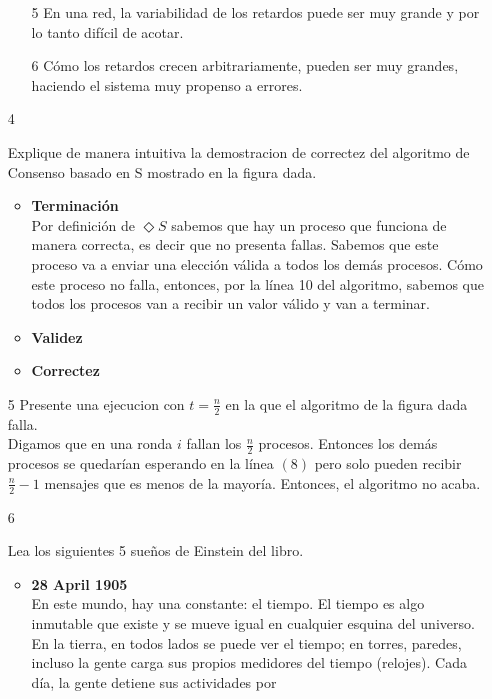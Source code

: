 \documentclass[12pt,a4paper]{report}
\begin{document}
\begin{itemize}
{\begin{itemize}
        \item[5]{En una red, la variabilidad de los retardos puede ser muy
            grande y por lo tanto difícil de acotar.}
        \item[6]{Cómo los retardos crecen arbitrariamente, pueden ser muy
            grandes, haciendo el sistema muy propenso a errores.}
    \end{itemize}
}
\item[4]{Explique de manera intuitiva la demostracion de correctez del
    algoritmo de Consenso basado en S mostrado en la figura dada.
    \begin{itemize}[label=$\circ$]
        \item{\textbf{Terminación}\\
            Por definición de $\Diamond S$  sabemos que hay un proceso que
            funciona de manera correcta, es decir que no presenta fallas.
            Sabemos que este proceso va a enviar una elección válida a todos los
            demás procesos. Cómo este proceso no falla, entonces, por la línea
            10 del algoritmo, sabemos que todos los procesos van a recibir un
            valor válido y van a terminar.
        }
        \item{\textbf{Validez}\\}
        \item{\textbf{Correctez}\\}
    \end{itemize}
}
\item[5]{Presente una ejecucion con $t=\tfrac{n}{2}$ en la que el algoritmo
    de la figura dada falla.\\
    Digamos que en una ronda $i$ fallan los $\tfrac{n}{2}$ procesos. Entonces
    los demás procesos se quedarían esperando en la línea $(8)$ pero solo pueden
    recibir $\tfrac{n}{2}-1$ mensajes que es menos de la mayoría. Entonces, el
    algoritmo no acaba.
}
\item[6]{Lea los siguientes 5 sueños de Einstein del libro.
    \begin{itemize}[label=$\bullet$]
        \item{\textbf{28 April 1905}\\
            En este mundo, hay una constante: el tiempo. El tiempo es algo
            inmutable que existe y se mueve igual en cualquier esquina del
            universo. En la tierra, en todos lados se puede ver el tiempo; en
            torres, paredes, incluso la gente carga sus propios medidores del
            tiempo (relojes). Cada día, la gente detiene sus actividades por
}
\end{itemize}}
\end{itemize}
\end{document}
